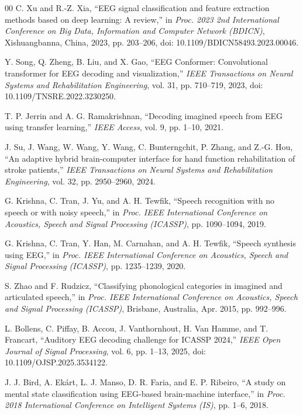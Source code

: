 \begin{thebibliography}{00}
C. Xu and R.-Z. Xia, ``EEG signal classification and feature extraction methods based
on deep learning: A review,'' in \textit{Proc. 2023 2nd International Conference on
Big Data, Information and Computer Network (BDICN)}, Xishuangbanna, China, 2023,
pp. 203--206, doi: 10.1109/BDICN58493.2023.00046.

Y. Song, Q. Zheng, B. Liu, and X. Gao, ``EEG Conformer: Convolutional transformer for
EEG decoding and visualization,'' \textit{IEEE Transactions on Neural Systems and
Rehabilitation Engineering}, vol. 31, pp. 710--719, 2023,
doi: 10.1109/TNSRE.2022.3230250.

T. P. Jerrin and A. G. Ramakrishnan, ``Decoding imagined speech from EEG using
transfer learning,'' \textit{IEEE Access}, vol. 9, pp. 1--10, 2021.

J. Su, J. Wang, W. Wang, Y. Wang, C. Bunterngchit, P. Zhang, and Z.-G. Hou,
``An adaptive hybrid brain-computer interface for hand function rehabilitation
of stroke patients,'' \textit{IEEE Transactions on Neural Systems and
Rehabilitation Engineering}, vol. 32, pp. 2950--2960, 2024.

G. Krishna, C. Tran, J. Yu, and A. H. Tewfik, ``Speech recognition with no speech
or with noisy speech,'' in \textit{Proc. IEEE International Conference on Acoustics,
Speech and Signal Processing (ICASSP)}, pp. 1090--1094, 2019.

G. Krishna, C. Tran, Y. Han, M. Carnahan, and A. H. Tewfik, ``Speech synthesis
using EEG,'' in \textit{Proc. IEEE International Conference on Acoustics, Speech
and Signal Processing (ICASSP)}, pp. 1235--1239, 2020.

S. Zhao and F. Rudzicz, ``Classifying phonological categories in imagined and
articulated speech,'' in \textit{Proc. IEEE International Conference on Acoustics,
Speech and Signal Processing (ICASSP)}, Brisbane, Australia, Apr. 2015,
pp. 992--996.

L. Bollens, C. Piffay, B. Accou, J. Vanthornhout, H. Van Hamme, and T. Francart,
``Auditory EEG decoding challenge for ICASSP 2024,'' \textit{IEEE Open Journal
of Signal Processing}, vol. 6, pp. 1--13, 2025,
doi: 10.1109/OJSP.2025.3534122.

J. J. Bird, A. Ek\'{a}rt, L. J. Manso, D. R. Faria, and E. P. Ribeiro, ``A study
on mental state classification using EEG-based brain-machine interface,'' in
\textit{Proc. 2018 International Conference on Intelligent Systems (IS)},
pp. 1--6, 2018.


\end{thebibliography}
